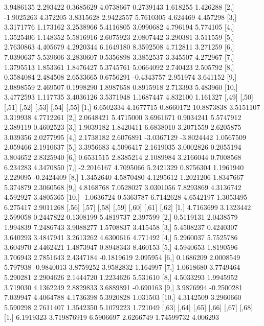 \documentclass[12pt]{article}
\begin{document}
\begin{Schunk}
\begin{Soutput}
 [1,]  3.9486135 2.293422 0.3685629 4.0738667  0.2739143 1.618255 1.426288
 [2,] -1.9025263 4.372205 3.8315628 2.9422557  5.7610305 4.624469 4.457298
 [3,]  3.3171776 1.173162 3.2538966 5.4116805  3.0990682 4.796194 5.774105
 [4,]  1.3525406 1.148352 5.5816916 2.6075923  2.0807442 3.290381 3.511559
 [5,]  2.7630863 4.405679 4.2920344 6.1649180  8.3592508 4.712811 3.271259
 [6,]  7.0390637 5.539606 3.2830607 0.5356898  3.3852537 3.345507 4.272967
 [7,]  1.3795513 1.853361 1.8476427 5.3745761  5.0664092 2.740423 2.505792
 [8,]  0.3584084 2.484508 2.6533665 0.6756291 -0.4343757 2.951974 3.641152
 [9,]  2.0898559 2.469507 0.1998290 1.8987658  0.8915918 2.713393 5.483960
[10,]  3.4772593 1.117735 3.4036126 3.5371948  1.1687447 4.832100 1.161327
           [,49]     [,50]      [,51]      [,52]     [,53]    [,54]      [,55]
 [1,]  6.6502334 4.1677715  0.8660172 10.8873838 3.5151107 3.319938  4.7712261
 [2,]  2.0648421 5.4715000  3.6961671  0.9034241 5.5747912 2.389119  0.4602523
 [3,]  1.9039182 1.8420411  6.6838010  3.2071559 2.6205875 3.039356  2.0277995
 [4,]  2.1738182 2.6076891 -3.0367129 -3.8024442 1.0567509 2.059466  2.1910637
 [5,]  3.3956683 4.5096417  2.1619035  3.0002826 0.2055194 3.804652  2.8325940
 [6,]  0.6531515 2.8385214  2.1089984  3.2166044 0.7008568 6.234283  4.3470850
 [7,] -2.2016167 4.7095066  5.2421329  0.8756304 1.1961940 2.229095 -0.2424409
 [8,]  1.3452640 4.5870480  4.1295612  1.2021206 1.8347667 5.374879  2.3060568
 [9,]  4.8168768 7.0528027  3.0301056  7.8293869 4.3136742 4.592927  3.4805365
[10,] -1.0636724 0.5363787  6.7142628  4.6542197 1.3053495 6.275417  2.9011268
          [,56]      [,57]    [,58]      [,59]     [,60]      [,61]     [,62]
 [1,] 4.7163699  3.1323442 2.599058  0.2447822 0.1308199  5.4819737  2.397599
 [2,] 0.5119131  2.0438579 1.994839  7.2486743 3.9088277  1.5708837  3.415458
 [3,] 5.4508237  0.4240307 3.640293  3.4847941 3.2613262  4.6300616  4.771492
 [4,] 5.2960037  5.7525786 3.604970  2.4462421 1.4873947  0.8948343  8.460153
 [5,] 4.5940653  1.8190596 3.706943  2.7851643 2.4347184 -0.1819619  2.095954
 [6,] 0.1686209  2.0008549 5.797938 -0.9840013 3.8759252  3.9582832  1.164997
 [7,] 1.0618680  3.7749464 5.290281  2.2904626 2.1444720  1.2234626  5.531610
 [8,] 4.5033293  1.9945952 3.719030  4.1362249 2.8829833  3.6889891 -0.690163
 [9,] 3.9876994 -0.2500281 7.039947  4.4064788 4.1736398  5.3920828  1.031503
[10,] 4.3142509  3.2960660 5.590298  2.7611407 1.3542350  5.1079223  1.721049
          [,63]        [,64]      [,65]      [,66]       [,67]    [,68]
 [1,] 6.1919323  3.719876919  6.5906697  2.6266749  1.74599732 4.006293

\end{Soutput}
\end{Schunk}
\end{document}

